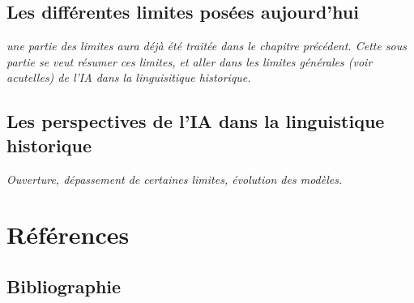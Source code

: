 \documentclass[12pt, letterpaper, french]{report}
\begin{document}
\section{Les différentes limites posées aujourd'hui}
\textit{une partie des limites aura déjà été traitée dans le chapitre précédent. Cette sous partie se veut résumer ces limites, et aller dans les limites générales (voir acutelles) de l'IA dans  la linguisitique historique.}
\section{Les perspectives de l'IA dans la linguistique historique}
\textit{Ouverture, dépassement de certaines limites, évolution des modèles.}

\chapter{Références}
\section{Bibliographie}

\printbibliography
\end{document}
